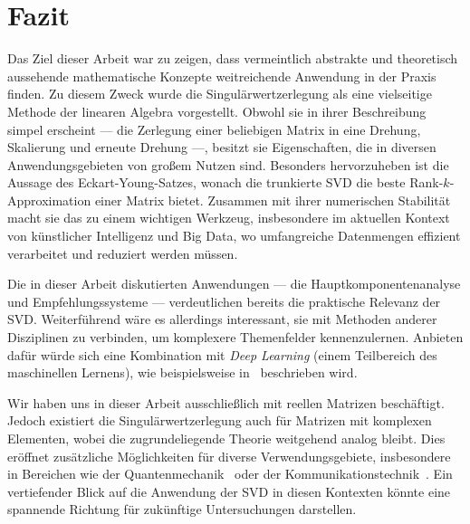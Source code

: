 \chapter{Fazit}

Das Ziel dieser Arbeit war zu zeigen, dass vermeintlich abstrakte und theoretisch aussehende mathematische Konzepte weitreichende Anwendung in der Praxis finden.
Zu diesem Zweck wurde die Singulärwertzerlegung als eine vielseitige Methode der linearen Algebra vorgestellt.
Obwohl sie in ihrer Beschreibung simpel erscheint --- die Zerlegung einer beliebigen Matrix in eine Drehung, Skalierung und erneute Drehung ---, besitzt sie Eigenschaften, die in diversen Anwendungsgebieten von großem Nutzen sind.
Besonders hervorzuheben ist die Aussage des Eckart-Young-Satzes, wonach die trunkierte SVD die beste Rank-\(k\)-Approximation einer Matrix bietet. 
Zusammen mit ihrer numerischen Stabilität macht sie das zu einem wichtigen Werkzeug, insbesondere im aktuellen Kontext von künstlicher Intelligenz und Big Data, wo umfangreiche Datenmengen effizient verarbeitet und reduziert werden müssen.

Die in dieser Arbeit diskutierten Anwendungen --- die Hauptkomponentenanalyse und Empfehlungssysteme --- verdeutlichen bereits die praktische Relevanz der SVD. %
Weiterführend wäre es allerdings interessant, sie mit Methoden anderer Disziplinen zu verbinden, um komplexere Themenfelder kennenzulernen.
Anbieten dafür würde sich eine Kombination mit \emph{Deep Learning} (einem Teilbereich des maschinellen Lernens), wie beispielsweise in~\cite{diaz-moralesDeepLearningCombined2024} beschrieben wird.

Wir haben uns in dieser Arbeit ausschließlich mit reellen Matrizen beschäftigt.
Jedoch existiert die Singulärwertzerlegung auch für Matrizen mit komplexen Elementen, wobei die zugrundeliegende Theorie weitgehend analog bleibt.
Dies eröffnet zusätzliche Möglichkeiten für diverse Verwendungsgebiete, insbesondere in Bereichen wie der Quantenmechanik~\cite{martinExtraordinarySVD2012} oder der Kommunikationstechnik~\cite{tseFundamentalsWirelessCommunication2005}.
Ein vertiefender Blick auf die Anwendung der SVD in diesen Kontexten könnte eine spannende Richtung für zukünftige Untersuchungen darstellen.

